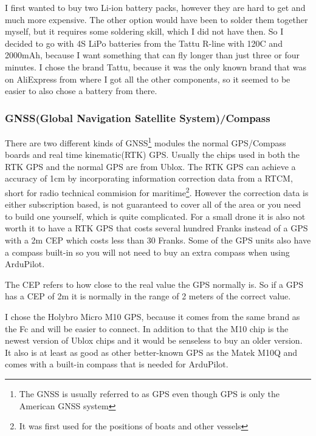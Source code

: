\documentclass{article}
\begin{document}
	I first wanted to buy two \gls{Li-ion} battery packs, however they are hard to get and much more expensive. The other option would have been to solder them together myself, but it requires some soldering skill, which I did not have then. So I decided to go with 4S \gls{LiPo} batteries from the Tattu R-line with 120C and 2000mAh\cite{tattu}, because I want something that can fly longer than just three or four minutes. I chose the brand Tattu, because it was the only known brand that was on AliExpress from where I got all the other components, so it seemed to be easier to also chose a battery from there. 
	

	\subsubsection{GNSS(Global Navigation Satellite System)/Compass}
	There are two different kinds of GNSS\footnote{The GNSS is usually referred to as GPS even though GPS is only the American GNSS system} modules the normal GPS/Compass boards and real time kinematic(RTK) GPS. Usually the chips used in both the RTK GPS and the normal GPS are from Ublox. The RTK GPS can achieve a accuracy of 1cm by incorporating information correction data from a RTCM, short for radio technical commision for maritime\footnote{It was first used for the positions of boats and other vessels}. However the correction data is either subscription based, is not guaranteed to cover all of the area or you need to build one yourself, which is quite complicated\cite{rtkgps}. For a small drone it is also not worth it to have a RTK GPS that costs several hundred Franks instead of a GPS with a 2m \gls{CEP} which costs less than 30 Franks. Some of the GPS units also have a compass built-in so you will not need to buy an extra compass when using ArduPilot. 
	\begin{Explanation}
		The \gls{CEP} refers to how close to the real value the \gls{GPS} normally is. So if a \gls{GPS} has a \gls{CEP}
		of 2m it is normally in the range of 2 meters of the correct value. \cite{CEP}
	\end{Explanation}
	
	I chose the Holybro Micro M10 GPS\cite{holybrom10micro}, because it comes from the same brand as the Fc and will be easier to connect. In addition to that the M10 chip is the newest version of Ublox chips and it would be senseless to buy an older version. It also is at least as good as other better-known GPS as the Matek M10Q\cite{gpstest} and comes with a built-in compass that is needed for ArduPilot.
\end{document}
